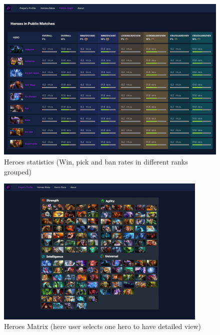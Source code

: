     \begin{figure}[h]
        \centering
        \includegraphics[width=\textwidth]{images/HeroStats}
        \caption{Heroes statistics (Win, pick and ban rates in different ranks grouped)}
    \end{figure}

    \begin{figure}[h]
        \centering
        \includegraphics[width=0.9\textwidth]{images/HeroMatrix}
        \caption{Heroes Matrix (here user selects one hero to have detailed view)}
    \end{figure}

